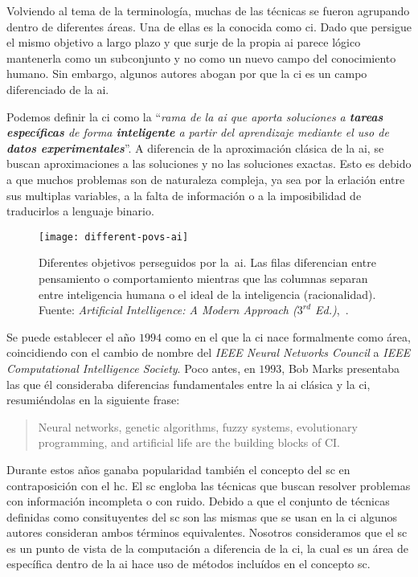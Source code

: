 Volviendo al tema de la terminología, muchas de las técnicas se fueron agrupando dentro de diferentes áreas. Una de ellas es la conocida como \acrlong{ci}. Dado que persigue el mismo objetivo a largo plazo y que surje de la propia \gls{ai} parece lógico mantenerla como un subconjunto y no como un nuevo campo del conocimiento humano. Sin embargo, algunos autores abogan por que la \gls{ci} es un campo diferenciado de la \gls{ai}.

Podemos definir la \acrlong{ci} como la \enquote{\textit{rama de la \gls{ai} que aporta soluciones a \textbf{tareas específicas} de forma \textbf{inteligente} a partir del aprendizaje mediante el uso de \textbf{datos experimentales}}}. A diferencia de la aproximación clásica de la \gls{ai}, se buscan aproximaciones a las soluciones y no las soluciones exactas. Esto es debido a que muchos problemas son de naturaleza compleja, ya sea por la erlación entre sus multiplas variables, a la falta de información o a la imposibilidad de traducirlos a lenguaje binario.

\begin{figure}
	\texttt{[image: different-povs-ai]}
	\caption[Diferentes objetivos perseguidos por la \acrlong{ai}]{Diferentes objetivos perseguidos por la~\acrlong{ai}. Las filas diferencian entre pensamiento o comportamiento mientras que las columnas separan entre inteligencia humana o el ideal de la inteligencia (racionalidad). Fuente: \textit{Artificial Intelligence: A Modern Approach ($3^{rd}$ Ed.)},~\cite{russell2003artificial}.}
	\label{fig:different-povs-ai}
\end{figure}

Se puede establecer el año $1994$ como en el que la \acrlong{ci} nace formalmente como área, coincidiendo con el cambio de nombre del \textit{IEEE Neural Networks Council} a \textit{IEEE Computational Intelligence Society}. Poco antes, en $1993$, Bob Marks presentaba las que él consideraba diferencias fundamentales entre la \acrlong{ai} clásica y la \acrlong{ci}, resumiéndolas en la siguiente frase:

\blockquote{Neural networks, genetic algorithms, fuzzy systems, evolutionary programming, and artificial life are the building blocks of CI.}

Durante estos años ganaba popularidad también el concepto del \gls{sc} en contraposición con el \gls{hc}. El \gls{sc} engloba las técnicas que buscan resolver problemas con información incompleta o con ruido. Debido a que el conjunto de técnicas definidas como consituyentes del \gls{sc} son las mismas que se usan en la \gls{ci} algunos autores consideran ambos términos equivalentes. Nosotros consideramos que el \gls{sc} es un punto de vista de la computación a diferencia de la \gls{ci}, la cual es un área de específica dentro de la \gls{ai} hace uso de métodos incluídos en el concepto \gls{sc}.

